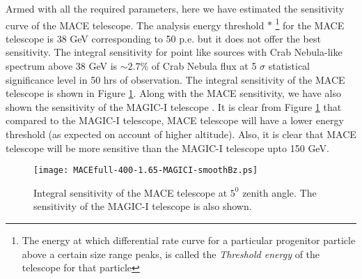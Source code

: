 \documentclass[preprint,12pt]{elsarticle}
\begin{document}
Armed with all the required parameters, here we have estimated the sensitivity curve of the MACE 
telescope. The analysis energy threshold $*$ \footnote{\small The energy 
at which differential rate curve for a particular progenitor particle above a certain size range 
peaks, is called the  \textit{Threshold energy} of the telescope for that particle} for the MACE telescope is  38 GeV corresponding to 
50 p.e. but it does not offer the best sensitivity. 
The integral sensitivity for point like sources with Crab Nebula-like spectrum 
above 38 GeV is $\sim 2.7\%$ of Crab Nebula flux at 5 $\sigma$ statistical 
significance level in 50 hrs of observation. The integral sensitivity of the MACE telescope is shown in Figure \ref{Figure:specs}. 
Along with the MACE sensitivity, we have also shown the sensitivity of the MAGIC-I telescope \cite{magic1}. %
It is clear from Figure \ref{Figure:specs} that compared to the MAGIC-I telescope, MACE telescope will have a lower energy threshold (as expected on account of
higher altitude). Also, it is clear that MACE telescope will be more sensitive than the MAGIC-I telescope upto 150 GeV.
 
\begin{figure}[!h]
\begin{center}
\texttt{[image: MACEfull-400-1.65-MAGICI-smoothBz.ps]}
\caption{\label{Figure.}Integral sensitivity of the MACE telescope at $5^{0}$ zenith angle. The sensitivity of the MAGIC-I telescope is also shown.}\label{Figure:specs} %
\end{center}
\end{figure}
\end{document}
